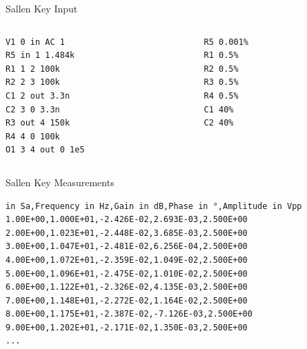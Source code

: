 \documentclass{beamer}
\begin{document}
  \begin{frame}[fragile]{Sallen Key Input}
    \begin{columns}
      \begin{column}{.3\textwidth}
        \begin{verbatim}
V1 0 in AC 1
R5 in 1 1.484k
R1 1 2 100k
R2 2 3 100k
C1 2 out 3.3n
C2 3 0 3.3n
R3 out 4 150k
R4 4 0 100k
O1 3 4 out 0 1e5
        \end{verbatim}
      \end{column}
      \begin{column}{.3\textwidth}
        \begin{verbatim}
R5 0.001%
R1 0.5%
R2 0.5%
R3 0.5%
R4 0.5%
C1 40%
C2 40%
        \end{verbatim}
      \end{column}
    \end{columns}
  \end{frame}
  \begin{frame}[fragile]{Sallen Key Measurements}
    \scriptsize
    \begin{center}
      

    \begin{verbatim}
in Sa,Frequency in Hz,Gain in dB,Phase in °,Amplitude in Vpp
1.00E+00,1.000E+01,-2.426E-02,2.693E-03,2.500E+00
2.00E+00,1.023E+01,-2.448E-02,3.685E-03,2.500E+00
3.00E+00,1.047E+01,-2.481E-02,6.256E-04,2.500E+00
4.00E+00,1.072E+01,-2.359E-02,1.049E-02,2.500E+00
5.00E+00,1.096E+01,-2.475E-02,1.010E-02,2.500E+00
6.00E+00,1.122E+01,-2.326E-02,4.135E-03,2.500E+00
7.00E+00,1.148E+01,-2.272E-02,1.164E-02,2.500E+00
8.00E+00,1.175E+01,-2.387E-02,-7.126E-03,2.500E+00
9.00E+00,1.202E+01,-2.171E-02,1.350E-03,2.500E+00
...
    \end{verbatim}
  \end{center}
  \end{frame}
\end{document}
